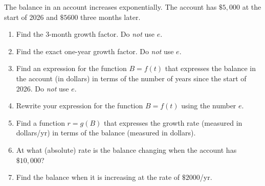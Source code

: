 \documentclass{ximera}
\begin{document}
\begin{question} \label{Qeirefr}
\item The balance in an account increases exponentially. The account has $\$5,000$ at the start of 2026 and $\$5600$ three months later.

\begin{enumerate}
\item Find the 3-month growth factor. Do \emph{not} use $e$.

\item Find the exact one-year growth factor. Do \emph{not} use $e$.

\item Find an expression for the function $B=f(t)$ that expresses the balance in the account (in dollars) in terms of the number of years since the start of 2026. Do \emph{not} use $e$.

\item Rewrite your expression for the function $B=f(t)$ using the number $e$.

\item Find a function $r=g(B)$ that expresses the growth rate (measured in dollars/yr) in terms of the balance (measured in dollars).

\item At what (absolute) rate is the balance changing when the account has $\$10,000$?

\item Find the balance when it is increasing at the rate of $\$2000$/yr.

\end{enumerate}

\end{question}
\end{document}
